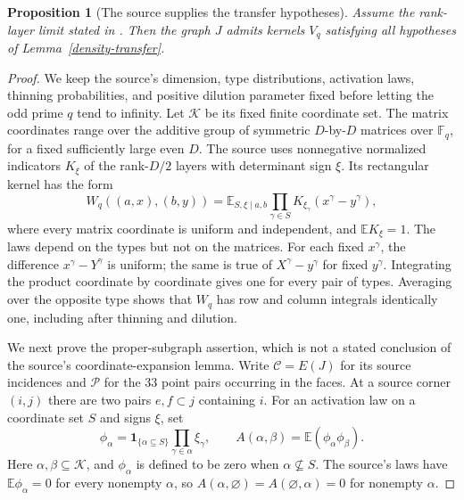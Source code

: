 \documentclass[a4paper,11pt,reqno]{amsart}
\theoremstyle{plain}
\newtheorem{proposition}[theorem]{Proposition}
\theoremstyle{definition}
\theoremstyle{remark}
\begin{document}
\begin{proposition}[The source supplies the transfer hypotheses]
\label{density-source-limits}
Assume the rank-layer limit stated in \citep[Section~3]{openai161}.
Then the graph $J$ admits kernels $V_q$ satisfying all hypotheses
of Lemma~\ref{density-transfer}.
\end{proposition}
\begin{proof}
We keep the source's dimension, type distributions, activation laws,
thinning probabilities, and positive dilution parameter fixed before
letting the odd prime $q$ tend to infinity.
Let $\mathcal K$ be its fixed finite coordinate set.  The matrix
coordinates range over the additive group of symmetric $D$-by-$D$
matrices over $\mathbb F_q$, for a fixed sufficiently large even $D$.
The source uses nonnegative normalized indicators $K_\xi$ of the
rank-$D/2$ layers with determinant sign $\xi$.  Its rectangular
kernel has the form
\[
 W_q((a,x),(b,y))
 =\mathbb E_{S,\xi\mid a,b}
       \prod_{\gamma\in S}K_{\xi_\gamma}(x^\gamma-y^\gamma),
\]
where every matrix coordinate is uniform and independent, and
$\mathbb E K_\xi=1$.  The laws depend on the types but not on the matrices.
For each fixed $x^\gamma$, the difference $x^\gamma-Y^\gamma$ is
uniform; the same is true of $X^\gamma-y^\gamma$ for fixed
$y^\gamma$.  Integrating the product coordinate by coordinate gives
one for every pair of types.  Averaging over the opposite type shows
that $W_q$ has row and column integrals identically one, including
after thinning and dilution.

We next prove the proper-subgraph assertion, which is not a stated
conclusion of the source's coordinate-expansion lemma.
Write $\mathscr C=E(J)$ for its source incidences and $\mathcal P$
for the $33$ point pairs occurring in the faces.
At a source corner $(i,j)$ there are two pairs $e,f\subset j$
containing $i$.
For an activation law on a coordinate set $S$ and signs $\xi$, set
\[
 \phi_\alpha=\mathbf1_{\{\alpha\subseteq S\}}
                   \prod_{\gamma\in\alpha}\xi_\gamma,\qquad
 A(\alpha,\beta)=\mathbb E(\phi_\alpha\phi_\beta).
\]
Here $\alpha,\beta\subseteq\mathcal K$, and $\phi_\alpha$ is defined
to be zero when $\alpha\not\subseteq S$.  The source's laws have
$\mathbb E\phi_\alpha=0$ for every nonempty
$\alpha$, so $A(\alpha,\varnothing)=A(\varnothing,\alpha)=0$ for
nonempty $\alpha$.


\end{proof}
\end{document}
